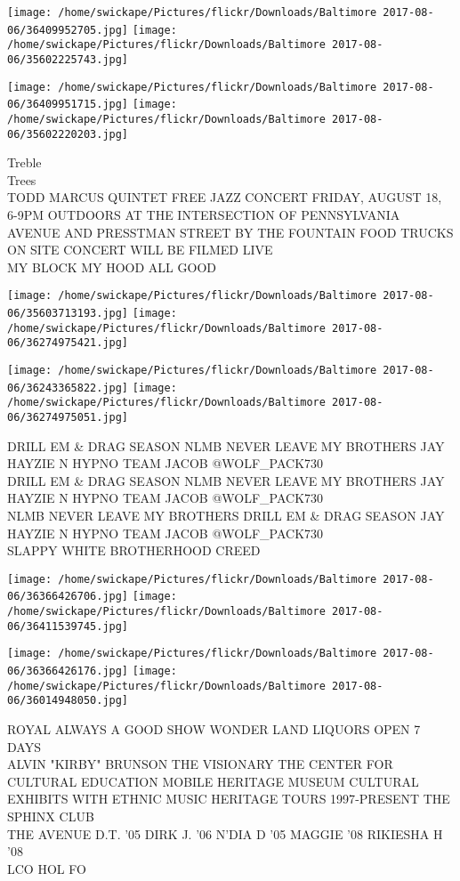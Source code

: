\documentclass[10pt,letterpaper]{article}
\begin{document}
\texttt{[image: /home/swickape/Pictures/flickr/Downloads/Baltimore 2017-08-06/36409952705.jpg]}
\texttt{[image: /home/swickape/Pictures/flickr/Downloads/Baltimore 2017-08-06/35602225743.jpg]}

\texttt{[image: /home/swickape/Pictures/flickr/Downloads/Baltimore 2017-08-06/36409951715.jpg]}
\texttt{[image: /home/swickape/Pictures/flickr/Downloads/Baltimore 2017-08-06/35602220203.jpg]}

Treble\\
Trees\\
TODD MARCUS QUINTET FREE JAZZ CONCERT FRIDAY, AUGUST 18, 6{-}9PM OUTDOORS AT THE INTERSECTION OF PENNSYLVANIA AVENUE AND PRESSTMAN STREET BY THE FOUNTAIN FOOD TRUCKS ON SITE CONCERT WILL BE FILMED LIVE\\
MY BLOCK MY HOOD ALL GOOD
\pagebreak

\texttt{[image: /home/swickape/Pictures/flickr/Downloads/Baltimore 2017-08-06/35603713193.jpg]}
\texttt{[image: /home/swickape/Pictures/flickr/Downloads/Baltimore 2017-08-06/36274975421.jpg]}

\texttt{[image: /home/swickape/Pictures/flickr/Downloads/Baltimore 2017-08-06/36243365822.jpg]}
\texttt{[image: /home/swickape/Pictures/flickr/Downloads/Baltimore 2017-08-06/36274975051.jpg]}

DRILL EM \& DRAG SEASON NLMB NEVER LEAVE MY BROTHERS JAY HAYZIE N HYPNO TEAM JACOB @WOLF\_PACK730\\
DRILL EM \& DRAG SEASON NLMB NEVER LEAVE MY BROTHERS JAY HAYZIE N HYPNO TEAM JACOB @WOLF\_PACK730\\
NLMB NEVER LEAVE MY BROTHERS DRILL EM \& DRAG SEASON JAY HAYZIE N HYPNO TEAM JACOB @WOLF\_PACK730\\
SLAPPY  WHITE BROTHERHOOD CREED
\pagebreak

\texttt{[image: /home/swickape/Pictures/flickr/Downloads/Baltimore 2017-08-06/36366426706.jpg]}
\texttt{[image: /home/swickape/Pictures/flickr/Downloads/Baltimore 2017-08-06/36411539745.jpg]}

\texttt{[image: /home/swickape/Pictures/flickr/Downloads/Baltimore 2017-08-06/36366426176.jpg]}
\texttt{[image: /home/swickape/Pictures/flickr/Downloads/Baltimore 2017-08-06/36014948050.jpg]}

ROYAL ALWAYS A GOOD SHOW WONDER LAND LIQUORS OPEN 7 DAYS\\
ALVIN "KIRBY" BRUNSON THE VISIONARY THE CENTER FOR CULTURAL EDUCATION MOBILE HERITAGE MUSEUM CULTURAL EXHIBITS WITH ETHNIC MUSIC HERITAGE TOURS 1997{-}PRESENT THE SPHINX CLUB\\
THE AVENUE D.T. '05 DIRK J. '06 N'DIA D '05 MAGGIE '08 RIKIESHA H '08\\
LCO HOL FO
\pagebreak
\end{document}
